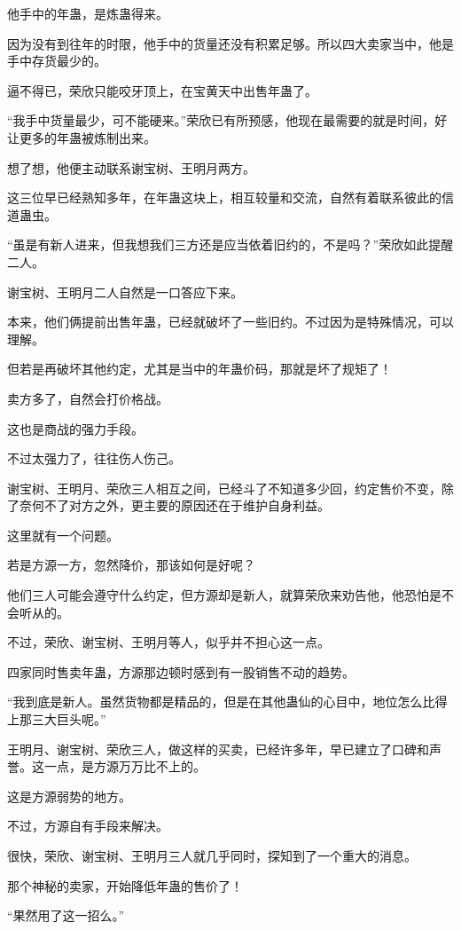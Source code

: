 \begin{this_body}
他手中的年蛊，是炼蛊得来。

因为没有到往年的时限，他手中的货量还没有积累足够。所以四大卖家当中，他是手中存货最少的。

逼不得已，荣欣只能咬牙顶上，在宝黄天中出售年蛊了。

“我手中货量最少，可不能硬来。”荣欣已有所预感，他现在最需要的就是时间，好让更多的年蛊被炼制出来。

想了想，他便主动联系谢宝树、王明月两方。

这三位早已经熟知多年，在年蛊这块上，相互较量和交流，自然有着联系彼此的信道蛊虫。

“虽是有新人进来，但我想我们三方还是应当依着旧约的，不是吗？”荣欣如此提醒二人。

谢宝树、王明月二人自然是一口答应下来。

本来，他们俩提前出售年蛊，已经就破坏了一些旧约。不过因为是特殊情况，可以理解。

但若是再破坏其他约定，尤其是当中的年蛊价码，那就是坏了规矩了！

卖方多了，自然会打价格战。

这也是商战的强力手段。

不过太强力了，往往伤人伤己。

谢宝树、王明月、荣欣三人相互之间，已经斗了不知道多少回，约定售价不变，除了奈何不了对方之外，更主要的原因还在于维护自身利益。

这里就有一个问题。

若是方源一方，忽然降价，那该如何是好呢？

他们三人可能会遵守什么约定，但方源却是新人，就算荣欣来劝告他，他恐怕是不会听从的。

不过，荣欣、谢宝树、王明月等人，似乎并不担心这一点。

四家同时售卖年蛊，方源那边顿时感到有一股销售不动的趋势。

“我到底是新人。虽然货物都是精品的，但是在其他蛊仙的心目中，地位怎么比得上那三大巨头呢。”

王明月、谢宝树、荣欣三人，做这样的买卖，已经许多年，早已建立了口碑和声誉。这一点，是方源万万比不上的。

这是方源弱势的地方。

不过，方源自有手段来解决。

很快，荣欣、谢宝树、王明月三人就几乎同时，探知到了一个重大的消息。

那个神秘的卖家，开始降低年蛊的售价了！

“果然用了这一招么。”


\end{this_body}
